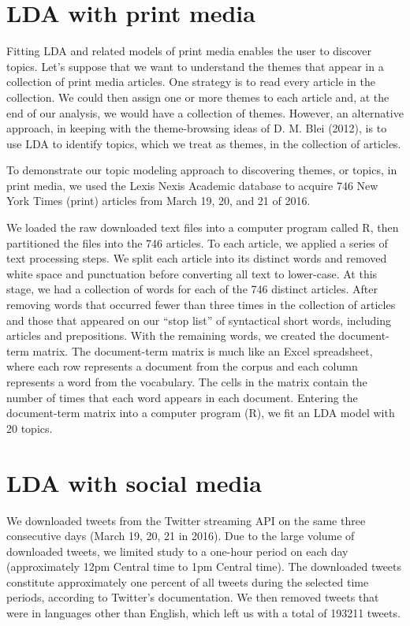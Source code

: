 \documentclass[12pt,]{article}
\begin{document}
\section{LDA with print media}\label{lda-with-print-media}

Fitting LDA and related models of print media enables the user to
discover topics. Let's suppose that we want to understand the themes
that appear in a collection of print media articles. One strategy is to
read every article in the collection. We could then assign one or more
themes to each article and, at the end of our analysis, we would have a
collection of themes. However, an alternative approach, in keeping with
the theme-browsing ideas of D. M. Blei (2012), is to use LDA to identify
topics, which we treat as themes, in the collection of articles.

To demonstrate our topic modeling approach to discovering themes, or
topics, in print media, we used the Lexis Nexis Academic database to
acquire 746 New York Times (print) articles from March 19, 20, and 21 of
2016.

We loaded the raw downloaded text files into a computer program called
R, then partitioned the files into the 746 articles. To each article, we
applied a series of text processing steps. We split each article into
its distinct words and removed white space and punctuation before
converting all text to lower-case. At this stage, we had a collection of
words for each of the 746 distinct articles. After removing words that
occurred fewer than three times in the collection of articles and those
that appeared on our ``stop list'' of syntactical short words, including
articles and prepositions. With the remaining words, we created the
document-term matrix. The document-term matrix is much like an Excel
spreadsheet, where each row represents a document from the corpus and
each column represents a word from the vocabulary. The cells in the
matrix contain the number of times that each word appears in each
document. Entering the document-term matrix into a computer program (R),
we fit an LDA model with 20 topics.

\section{LDA with social media}\label{lda-with-social-media}

We downloaded tweets from the Twitter streaming API on the same three
consecutive days (March 19, 20, 21 in 2016). Due to the large volume of
downloaded tweets, we limited study to a one-hour period on each day
(approximately 12pm Central time to 1pm Central time). The downloaded
tweets constitute approximately one percent of all tweets during the
selected time periods, according to Twitter's documentation. We then
removed tweets that were in languages other than English, which left us
with a total of 193211 tweets.
\end{document}
